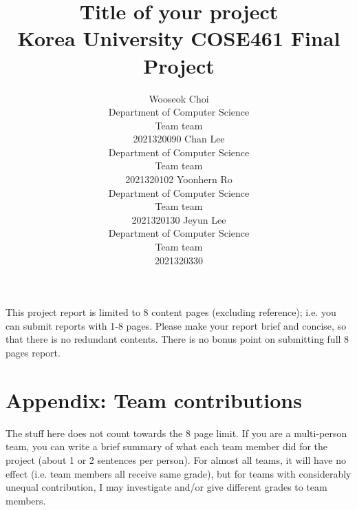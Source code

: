 \documentclass{article}
\title{
  Title of your project \\
  \vspace{1em}
  \small{\normalfont Korea University COSE461 Final Project}  %
}
\author{
  Wooseok Choi \\
   Department of Computer Science \\
   Team team \\
   2021320090 
   \And 
   Chan Lee \\
   Department of Computer Science \\
   Team team \\
   2021320102
   \And 
   Yoonhern Ro \\
   Department of Computer Science \\
   Team team \\
   2021320130
   \And 
   Jeyun Lee \\
   Department of Computer Science \\
   Team team \\
   2021320330
}
\begin{document}
\maketitle


This project report is limited to 8 content pages (excluding reference); i.e. you can submit reports with 1-8 pages. Please make your report brief and concise, so that there is no redundant contents. There is no bonus point on submitting full 8 pages report. 











\newpage
\appendix

\section{Appendix: Team contributions}
The stuff here does not count towards the 8 page limit. If you are a multi-person team, you can write a brief summary of what each team member did for the project (about 1 or 2 sentences per person). For almost all teams, it will have no effect (i.e. team members all receive same grade), but for teams with considerably unequal contribution, I may investigate and/or give different grades to team members.
\end{document}

